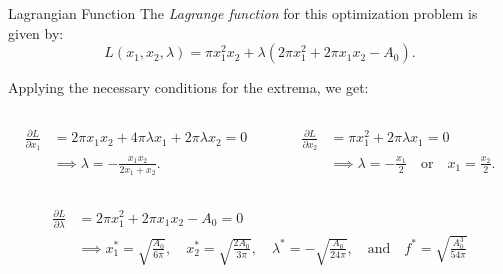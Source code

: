 \documentclass[
    NAME={Dr. Helga Ingimundardóttir},
    EMAIL={helgaingim@hi.is},
    FACULTY={Industrial Engineering},
    TITLE={Nonlinear Optimization},
    SUBTITLE={Approaches and Challenges},
    SEMINAR={VÉL113F},
    DATE={Design and Optimization}
]{../HI-latex/hi-beamer}
\begin{document}
\begin{frame}{Lagrangian Function}
        The \emph{Lagrange function} for this optimization problem is given by:
        \[
            L(x_1,x_2,\lambda) = \pi x_1^2 x_2 + \lambda \left(2\pi x_1^2 + 2\pi x_1x_2 - A_0\right).
        \]

        Applying the \alert{necessary conditions} for the extrema, we get:
            {\small
        \begin{columns}
            \begin{column}{0.5\textwidth}
                \begin{align*}
                    \frac{\partial L}{\partial x_1}
                    &= 2\pi x_1 x_2 + 4\pi \lambda x_1 + 2\pi \lambda x_2 = 0 \\
                    &\implies \lambda = -\frac{x_1 x_2}{2x_1 + x_2}.
                \end{align*}
            \end{column}
            \begin{column}{0.5\textwidth}
                \begin{align*}
                    \frac{\partial L}{\partial x_2}
                    &= \pi x_1^2 + 2\pi \lambda x_1 = 0\\
                    &\implies \lambda = -\frac{x_1}{2} \quad \text{or} \quad x_1 = \frac{x_2}{2}.
                \end{align*}
            \end{column}
        \end{columns}
        \begin{align*}
            \frac{\partial L}{\partial \lambda}
            &= 2\pi x_1^2 + 2\pi x_1x_2 - A_0 = 0 \\
            &\implies x_1^* = \sqrt{\frac{A_0}{6\pi}},
            \quad x_2^* = \sqrt{\frac{2A_0}{3\pi}},
            \quad \lambda^* = -\sqrt{\frac{A_0}{24\pi}},
            \quad \text{and} \quad f^* = \sqrt{\frac{A_0^3}{54\pi}}
        \end{align*}
        }
        \framebreak


\end{frame}
\end{document}
